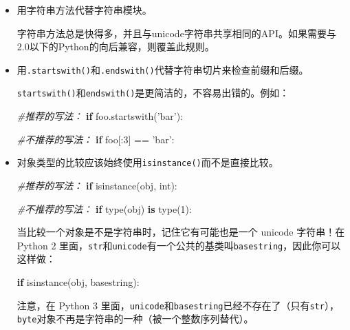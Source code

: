\documentclass[ignorenonframetext,9pt]{beamer}
\newenvironment{Shaded}{}{}
\newcommand{\BuiltInTok}[1]{#1}
\newcommand{\CommentTok}[1]{\textcolor[rgb]{0.38,0.63,0.69}{\textit{#1}}}
\newcommand{\ControlFlowTok}[1]{\textcolor[rgb]{0.00,0.44,0.13}{\textbf{#1}}}
\newcommand{\DecValTok}[1]{\textcolor[rgb]{0.25,0.63,0.44}{#1}}
\newcommand{\KeywordTok}[1]{\textcolor[rgb]{0.00,0.44,0.13}{\textbf{#1}}}
\newcommand{\NormalTok}[1]{#1}
\newcommand{\OperatorTok}[1]{\textcolor[rgb]{0.40,0.40,0.40}{#1}}
\newcommand{\StringTok}[1]{\textcolor[rgb]{0.25,0.44,0.63}{#1}}
\begin{document}
\begin{frame}[fragile]

\begin{itemize}
\item
  用字符串方法代替字符串模块。

  字符串方法总是快得多，并且与unicode字符串共享相同的API。如果需要与2.0以下的Python的向后兼容，则覆盖此规则。
\item
  用\texttt{\textquotesingle{}\textquotesingle{}.startswith()}和\texttt{\textquotesingle{}\textquotesingle{}.endswith()}代替字符串切片来检查前缀和后缀。

  \texttt{startswith()}和\texttt{endswith()}是更简洁的，不容易出错的。例如：

\begin{Shaded}
\begin{Highlighting}[]
\CommentTok{#推荐的写法：}
\ControlFlowTok{if}\NormalTok{ foo.startswith(}\StringTok{'bar'}\NormalTok{):}

\CommentTok{#不推荐的写法：}
\ControlFlowTok{if}\NormalTok{ foo[:}\DecValTok{3}\NormalTok{] }\OperatorTok{==} \StringTok{'bar'}\NormalTok{:}
\end{Highlighting}
\end{Shaded}
\end{itemize}

\end{frame}

\begin{frame}[fragile]

\begin{itemize}
\item
  对象类型的比较应该始终使用\texttt{isinstance()}而不是直接比较。

\begin{Shaded}
\begin{Highlighting}[]
\CommentTok{#推荐的写法：}
\ControlFlowTok{if} \BuiltInTok{isinstance}\NormalTok{(obj, }\BuiltInTok{int}\NormalTok{):}

\CommentTok{#不推荐的写法：}
\ControlFlowTok{if} \BuiltInTok{type}\NormalTok{(obj) }\KeywordTok{is} \BuiltInTok{type}\NormalTok{(}\DecValTok{1}\NormalTok{):}
\end{Highlighting}
\end{Shaded}

  当比较一个对象是不是字符串时，记住它有可能也是一个 unicode 字符串！在
  Python 2
  里面，\texttt{str}和\texttt{unicode}有一个公共的基类叫\texttt{basestring}，因此你可以这样做：

\begin{Shaded}
\begin{Highlighting}[]
\ControlFlowTok{if} \BuiltInTok{isinstance}\NormalTok{(obj, }\BuiltInTok{basestring}\NormalTok{):}
\end{Highlighting}
\end{Shaded}

  注意，在 Python 3
  里面，\texttt{unicode}和\texttt{basestring}已经不存在了（只有\texttt{str}），\texttt{byte}对象不再是字符串的一种（被一个整数序列替代）。
\end{itemize}

\end{frame}
\end{document}
